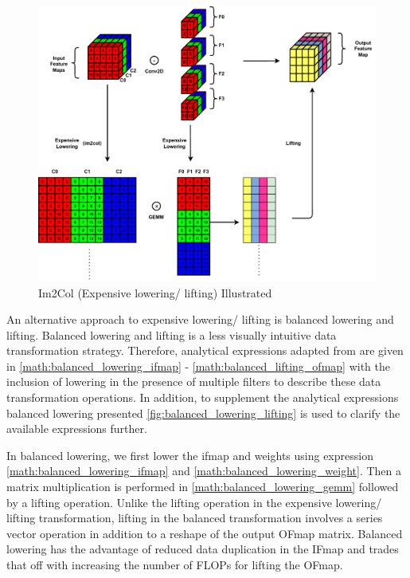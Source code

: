 \begin{figure}[ht]
    \centering
    \includegraphics[scale=0.6]{fig/Im2Col.pdf}
    \caption{Im2Col (Expensive lowering/ lifting) Illustrated}
    \label{fig:im2col}
\end{figure}

An alternative approach to expensive lowering/ lifting is balanced lowering and
lifting. Balanced lowering and lifting is a less visually intuitive data
transformation strategy. Therefore, analytical expressions adapted from
\cite{cafe_con_troll} are given in \eqref{math:balanced_lowering_ifmap} -
\eqref{math:balanced_lifting_ofmap} with the inclusion of lowering in
the presence of multiple filters to describe these data transformation
operations. In addition, to supplement the analytical expressions balanced
lowering presented \autoref{fig:balanced_lowering_lifting} is used to clarify
the available expressions further.  

In balanced lowering, we first lower the ifmap and weights using expression
\eqref{math:balanced_lowering_ifmap} and \eqref{math:balanced_lowering_weight}.
Then a matrix multiplication is performed in \eqref{math:balanced_lowering_gemm}
followed by a lifting operation. Unlike the lifting operation in the expensive
lowering/ lifting transformation, lifting in the balanced transformation
involves a series vector operation in addition to a reshape of the output OFmap
matrix. Balanced lowering has the advantage of reduced data duplication in the
IFmap and trades that off with increasing the number of FLOPs for lifting the
OFmap. 
 
